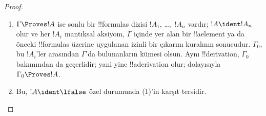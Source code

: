 \documentclass[../../../include/open-logic-section]{subfiles}
\begin{document}
\begin{proof}
  \begin{enumerate}
    \item $\Gamma \Proves !A$ ise sonlu bir !!{formula}s dizisi
      $!A_1$, \dots,~$!A_n$ vardır; $!A \ident !A_n$ olur ve her $!A_i$
      mantıksal aksiyom, $\Gamma$ içinde yer alan bir !!a{element} ya da
      önceki !!{formula}s üzerine uygulanan izinli bir çıkarım kuralının
      sonucudur.
      $\Gamma_0$, bu $!A_i$'ler arasından $\Gamma$'da bulunanların kümesi
      olsun. Aynı !!{derivation}, $\Gamma_0$ bakımından da geçerlidir; yani
      yine !!a{derivation} olur;
      dolayısıyla $\Gamma_0 \Proves !A$.
    \item Bu, $!A \ident \lfalse$ özel durumunda (1)'in karşıt tersidir.
  \end{enumerate}
\end{proof}
\end{document}

